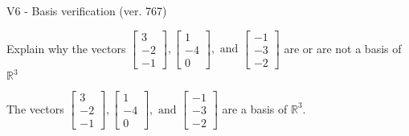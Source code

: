 \begin{exercise}
  \begin{exerciseTitle}V6 - Basis verification (ver. 767)\end{exerciseTitle}
  \begin{exerciseStatement}
    Explain why the vectors \(\left[\begin{array}{r}
3 \\
-2 \\
-1
\end{array}\right] , \left[\begin{array}{r}
1 \\
-4 \\
0
\end{array}\right] , \text{ and } \left[\begin{array}{r}
-1 \\
-3 \\
-2
\end{array}\right]\) are or are not a basis of \(\mathbb{R}^3\)	


  \end{exerciseStatement}
  \begin{exerciseAnswer}
   The vectors \(\left[\begin{array}{r}
3 \\
-2 \\
-1
\end{array}\right] , \left[\begin{array}{r}
1 \\
-4 \\
0
\end{array}\right] , \text{ and } \left[\begin{array}{r}
-1 \\
-3 \\
-2
\end{array}\right]\) 
  	 are  a basis of \(\mathbb{R}^3\).
  


  \end{exerciseAnswer}
\end{exercise}